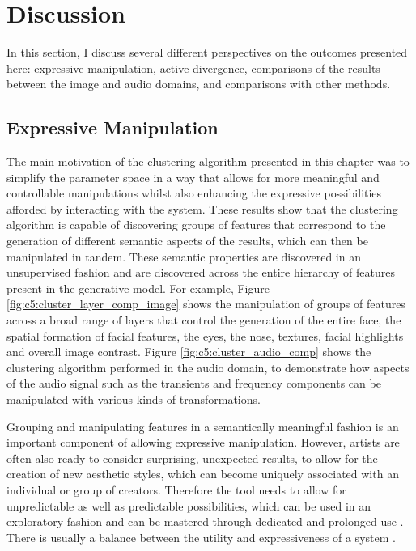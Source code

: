 \section{Discussion}

In this section, I discuss several different perspectives on the outcomes presented here: expressive manipulation, active divergence, comparisons of the results between the image and audio domains, and comparisons with other methods.

\subsection{Expressive Manipulation}

The main motivation of the clustering algorithm presented in this chapter was to simplify the parameter space in a way that allows for more meaningful and controllable manipulations whilst also enhancing the expressive possibilities afforded by interacting with the system. 
These results show that the clustering algorithm is capable of discovering groups of features that correspond to the generation of different semantic aspects of the results, which can then be manipulated in tandem. 
These semantic properties are discovered in an unsupervised fashion and are discovered across the entire hierarchy of features present in the generative model. 
For example, Figure \ref{fig:c5:cluster_layer_comp_image} shows the manipulation of groups of features across a broad range of layers that control the generation of the entire face, the spatial formation of facial features, the eyes, the nose, textures, facial highlights and overall image contrast. Figure \ref{fig:c5:cluster_audio_comp} shows the clustering algorithm performed in the audio domain, to demonstrate how aspects of the audio signal such as the transients and frequency components can be manipulated with various kinds of transformations.

Grouping and manipulating features in a semantically meaningful fashion is an important component of allowing expressive manipulation. 
However, artists are often also ready to consider surprising, unexpected results, to allow for the creation of new aesthetic styles, which can become uniquely associated with an individual or group of creators. 
Therefore the tool needs to allow for unpredictable as well as predictable possibilities, which can be used in an exploratory fashion and can be mastered through dedicated and prolonged use \citep{dobrian2006nime}. 
There is usually a balance between the utility and expressiveness of a system \citep{jacobs2017supporting}. 

